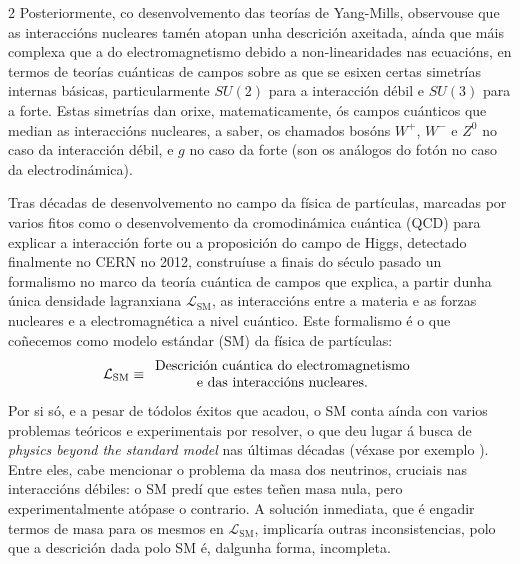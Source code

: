 \begin{multicols}{2}
Posteriormente, co desenvolvemento das teorías de Yang-Mills, observouse que as
interaccións nucleares tamén atopan unha descrición axeitada, aínda que máis
complexa que a do electromagnetismo debido a non-linearidades nas ecuacións, en %
termos de teorías cuánticas de campos sobre as que se esixen certas simetrías
internas básicas, particularmente $SU(2)$ para a interacción débil e $SU(3)$
para a forte. Estas simetrías dan orixe, matematicamente, ós campos cuánticos
que median as interaccións nucleares, a saber, os chamados bosóns $W^+$, $W^-$
e $Z^0$ no caso da interacción débil, e $g$ no caso da forte (son os análogos
do fotón no caso da electrodinámica).

Tras décadas de desenvolvemento no campo da física de partículas, marcadas por
varios fitos como o desenvolvemento da cromodinámica cuántica (QCD) para
explicar a interacción forte ou a proposición do campo de Higgs, detectado
finalmente no CERN no 2012, construíuse a finais do século pasado un formalismo
no marco da teoría cuántica de campos que explica, a partir dunha única
densidade lagranxiana $\mathcal{L}_\text{SM}$, as interaccións entre a materia
e as forzas nucleares e a electromagnética a nivel cuántico. Este formalismo é
o que coñecemos como modelo estándar (SM) da física de partículas:
%
\[
    \begin{array}{c@{\;\equiv\;}c}
        \mathcal{L}_\text{SM} &
        \begin{array}{c}
            \text{Descrición cuántica do electromagnetismo} \\
            \text{e das interaccións nucleares.}
        \end{array}
    \end{array}
\]
%
Por si só, e a pesar de tódolos éxitos que acadou, o SM conta aínda con
varios problemas teóricos e experimentais por resolver, o que deu lugar á busca
de \textit{physics beyond the standard model} nas últimas décadas (véxase por
exemplo \cite{BSM}). Entre eles, cabe mencionar o problema da masa
dos neutrinos, cruciais nas interaccións débiles: o SM predí que estes teñen
masa nula, pero experimentalmente atópase o contrario. A solución inmediata,
que é engadir termos de masa para os mesmos en $\mathcal{L}_\text{SM}$,
implicaría outras inconsistencias, polo que a descrición dada polo SM é,
dalgunha forma, incompleta.


\end{multicols}
